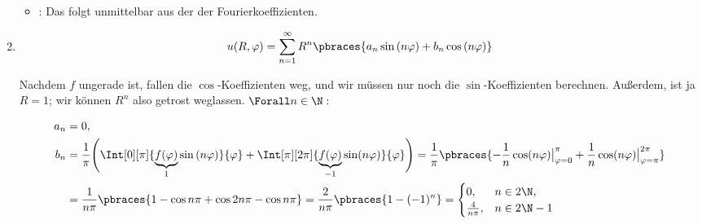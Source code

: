 \begin{solution}
\begin{enumerate}[label = (\roman*)]
\begin{itemize}
        \item {}:
        Das folgt unmittelbar aus der  der Fourierkoeffizienten.

    \end{itemize}

    \item

    \begin{align*}
        u(R, \varphi)
        =
        \sum_{n=1}^\infty
        R^n
        \pbraces
        {
            a_n \sin{(n\varphi)}
            +
            b_n \cos{(n\varphi)}
        }
    \end{align*}

    Nachdem $f$ ungerade ist, fallen die $\cos$-Koeffizienten weg, und wir müssen nur noch die $\sin$-Koeffizienten berechnen.
    Außerdem, ist ja $R = 1$; wir können $R^n$ also getrost weglassen.
    $\Forall n \in \N:$

    \begin{align*}
        a_n & = 0, \\
        b_n
        & =
        \frac{1}{\pi}
        \Bigg (
            \Int[0][\pi]
            {
                \underbrace{f(\varphi)}_1
                \sin{(n \varphi)}
            }{\varphi}
            +
            \Int[\pi][2 \pi]
            {
                \underbrace{f(\varphi)}_{-1}
                \sin(n \varphi)
            }{\varphi}
        \Bigg )
        =
        \frac{1}{\pi}
        \pbraces
        {
            -\frac{1}{n}
            \cos(n \varphi)
            \big |_{\varphi = 0}^\pi
            +
            \frac{1}{n}
            \cos(n \varphi)
            \big |_{\varphi = \pi}^{2 \pi}
        } \\
        & =
        \frac{1}{n \pi}
        \pbraces
        {
            1 - \cos{n \pi}
            +
            \cos{2n \pi} - \cos{n \pi}
        }
        =
        \frac{2}{n \pi}
        \pbraces
        {
            1 - (-1)^n
        }
        =
        \begin{cases}
            0,               & n \in 2 \N, \\
            \frac{4}{n \pi}, & n \in 2 \N - 1
        \end{cases}
    \end{align*}

\end{enumerate}



\end{solution}


